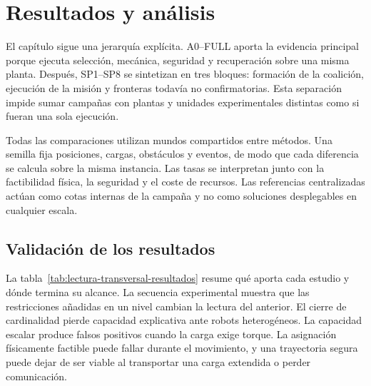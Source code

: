 \section{Resultados y análisis}
\label{sec:modelo-resultados}

El capítulo sigue una jerarquía explícita. A0--FULL aporta la evidencia principal porque ejecuta selección, mecánica, seguridad y recuperación sobre una misma planta. Después, SP1--SP8 se sintetizan en tres bloques: formación de la coalición, ejecución de la misión y fronteras todavía no confirmatorias. Esta separación impide sumar campañas con plantas y unidades experimentales distintas como si fueran una sola ejecución.

Todas las comparaciones utilizan mundos compartidos entre métodos. Una semilla fija posiciones, cargas, obstáculos y eventos, de modo que cada diferencia se calcula sobre la misma instancia. Las tasas se interpretan junto con la factibilidad física, la seguridad y el coste de recursos. Las referencias centralizadas actúan como cotas internas de la campaña y no como soluciones desplegables en cualquier escala.




\subsection{Validación de los resultados}

La tabla~\ref{tab:lectura-transversal-resultados} resume qué aporta cada estudio y dónde termina su alcance. La secuencia experimental muestra que las restricciones añadidas en un nivel cambian la lectura del anterior. El cierre de cardinalidad pierde capacidad explicativa ante robots heterogéneos. La capacidad escalar produce falsos positivos cuando la carga exige torque. La asignación físicamente factible puede fallar durante el movimiento, y una trayectoria segura puede dejar de ser viable al transportar una carga extendida o perder comunicación.

